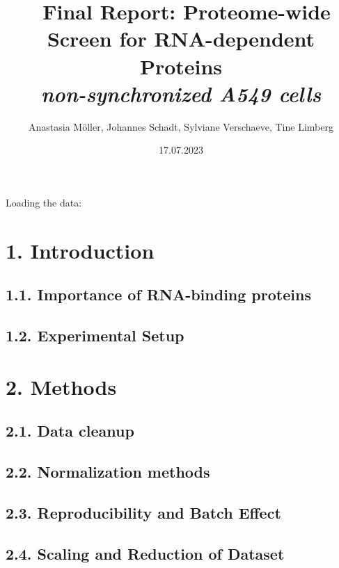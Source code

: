\documentclass[
]{article}
\title{\Huge~\textbf{Final Report:} Proteome-wide Screen for
RNA-dependent Proteins\\
\emph{non-synchronized A549 cells}}
\author{Anastasia Möller, Johannes Schadt, Sylviane Verschaeve, Tine
Limberg}
\date{17.07.2023}
\begin{document}
\maketitle

{
\setcounter{tocdepth}{2}
\tableofcontents
}
Loading the data:

\hypertarget{introduction}{%
\section{1. Introduction}\label{introduction}}

\hypertarget{importance-of-rna-binding-proteins}{%
\subsection{1.1. Importance of RNA-binding
proteins}\label{importance-of-rna-binding-proteins}}

\hypertarget{experimental-setup}{%
\subsection{1.2. Experimental Setup}\label{experimental-setup}}

\hypertarget{methods}{%
\section{2. Methods}\label{methods}}

\hypertarget{data-cleanup}{%
\subsection{2.1. Data cleanup}\label{data-cleanup}}

\hypertarget{normalization-methods}{%
\subsection{2.2. Normalization methods}\label{normalization-methods}}

\hypertarget{reproducibility-and-batch-effect}{%
\subsection{2.3. Reproducibility and Batch
Effect}\label{reproducibility-and-batch-effect}}

\hypertarget{scaling-and-reduction-of-dataset}{%
\subsection{2.4. Scaling and Reduction of
Dataset}\label{scaling-and-reduction-of-dataset}}
\end{document}
